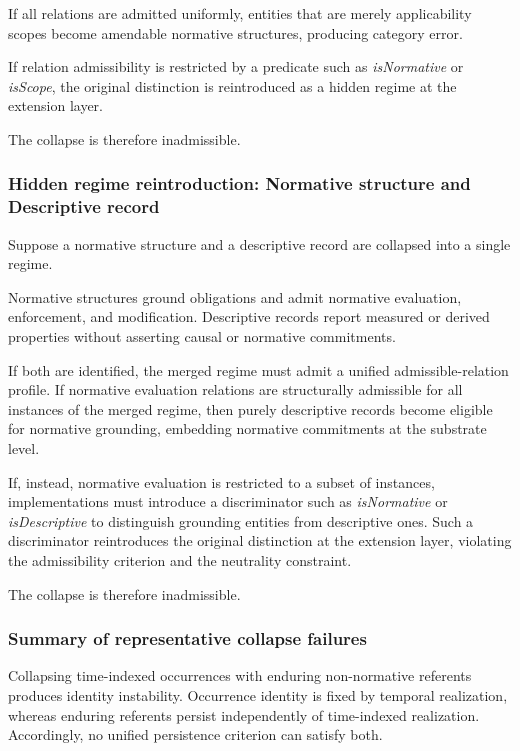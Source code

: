 If all relations are admitted uniformly,
entities that are merely applicability scopes become amendable
normative structures, producing category error.

If relation admissibility is restricted by a predicate
such as \emph{isNormative} or \emph{isScope},
the original distinction is reintroduced
as a hidden regime at the extension layer.

The collapse is therefore inadmissible.

\subsubsection{Hidden regime reintroduction: Normative structure and Descriptive record}

Suppose a normative structure and a descriptive record
are collapsed into a single regime.

Normative structures ground obligations and admit
normative evaluation, enforcement, and modification.
Descriptive records report measured or derived properties
without asserting causal or normative commitments.

If both are identified, the merged regime must admit
a unified admissible-relation profile.
If normative evaluation relations are structurally admissible
for all instances of the merged regime,
then purely descriptive records become eligible
for normative grounding,
embedding normative commitments at the substrate level.

If, instead, normative evaluation is restricted to
a subset of instances,
implementations must introduce a discriminator
such as \emph{isNormative} or \emph{isDescriptive}
to distinguish grounding entities from descriptive ones.
Such a discriminator reintroduces the original distinction
at the extension layer,
violating the admissibility criterion and the neutrality constraint.

The collapse is therefore inadmissible.

\subsubsection{Summary of representative collapse failures}

Collapsing time-indexed occurrences with enduring non-normative referents
produces identity instability.
Occurrence identity is fixed by temporal realization, whereas
enduring referents persist independently of time-indexed realization.
Accordingly, no unified persistence criterion can satisfy both.

